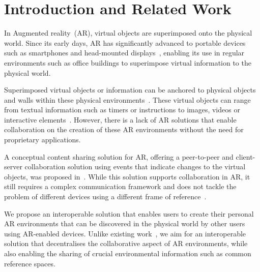 \section{Introduction and Related Work}
In Augmented reality~(AR), virtual objects are superimposed onto the physical world. Since its early days, AR has significantly advanced to portable devices such as smartphones and head-mounted displays~\cite{10.5555/2427126}, enabling its use in regular environments such as office buildings to superimpose virtual information to the physical world.

Superimposed virtual objects or information can be anchored to physical objects and walls within these physical environments~\cite{10.1145/3301275.3302278,kalaitzakis2021fiducial}. These virtual objects can range from textual information such as timers or instructions to images, videos or interactive elements~\cite{6948506}. However, there is a lack of AR solutions that enable collaboration on the creation of these AR environments without the need for proprietary applications.

A conceptual content sharing solution for AR, offering a peer-to-peer and client-server collaboration solution using events that indicate changes to the virtual objects, was proposed in~\cite{236306}. While this solution supports collaboration in AR, it still requires a complex communication framework and does not tackle the problem of different devices using a different frame of reference~\cite{mou2004frames}.

We propose an interoperable solution that enables users to create their personal AR environments that can be discovered in the physical world by other users using AR-enabled devices. Unlike existing work~\cite{10.1145/3567721}, we aim for an interoperable solution that decentralises the collaborative aspect of AR environments, while also enabling the sharing of crucial environmental information such as common reference spaces.